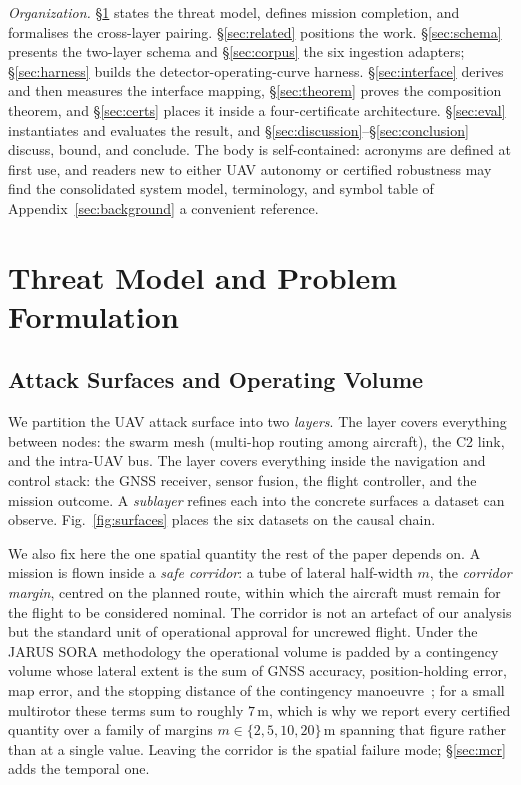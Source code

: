 \emph{Organization.}
\S\ref{sec:problem} states the threat model, defines mission completion, and
formalises the cross-layer pairing. \S\ref{sec:related} positions the work.
\S\ref{sec:schema} presents the two-layer schema and \S\ref{sec:corpus} the six
ingestion adapters; \S\ref{sec:harness} builds the detector-operating-curve
harness. \S\ref{sec:interface} derives and then measures the interface mapping,
\S\ref{sec:theorem} proves the composition theorem, and \S\ref{sec:certs}
places it inside a four-certificate architecture. \S\ref{sec:eval} instantiates
and evaluates the result, and
\S\ref{sec:discussion}--\S\ref{sec:conclusion} discuss, bound, and conclude. The
body is self-contained: acronyms are defined at first use, and readers new to
either UAV autonomy or certified robustness may find the consolidated system
model, terminology, and symbol table of Appendix~\ref{sec:background} a
convenient reference.

\section{Threat Model and Problem Formulation}
\label{sec:problem}
\subsection{Attack Surfaces and Operating Volume}
We partition the UAV attack surface into two \emph{layers}. The \layernet{}
layer covers everything between nodes: the swarm mesh (multi-hop routing among
aircraft), the C2 link, and the intra-UAV bus. The \layerauto{} layer covers
everything inside the navigation and control stack: the GNSS receiver, sensor
fusion, the flight controller, and the mission outcome. A \emph{sublayer}
refines each into the concrete surfaces a dataset can observe.
Fig.~\ref{fig:surfaces} places the six datasets on the causal chain.

We also fix here the one spatial quantity the rest of the paper depends on. A
mission is flown inside a \emph{safe corridor}: a tube of lateral half-width
$m$, the \emph{corridor margin}, centred on the planned route, within which the
aircraft must remain for the flight to be considered nominal. The corridor is
not an artefact of our analysis but the standard unit of operational approval
for uncrewed flight. Under the JARUS SORA methodology the operational volume is
padded by a contingency volume whose lateral extent is the sum of GNSS accuracy,
position-holding error, map error, and the stopping distance of the contingency
manoeuvre~\cite{jarus_sora25}; for a small multirotor these terms sum to roughly
$7$\,m, which is why we report every certified quantity over a family of margins
$m\in\{2,5,10,20\}$\,m spanning that figure rather than at a single value.
Leaving the corridor is the spatial failure mode; \S\ref{sec:mcr} adds the
temporal one.

